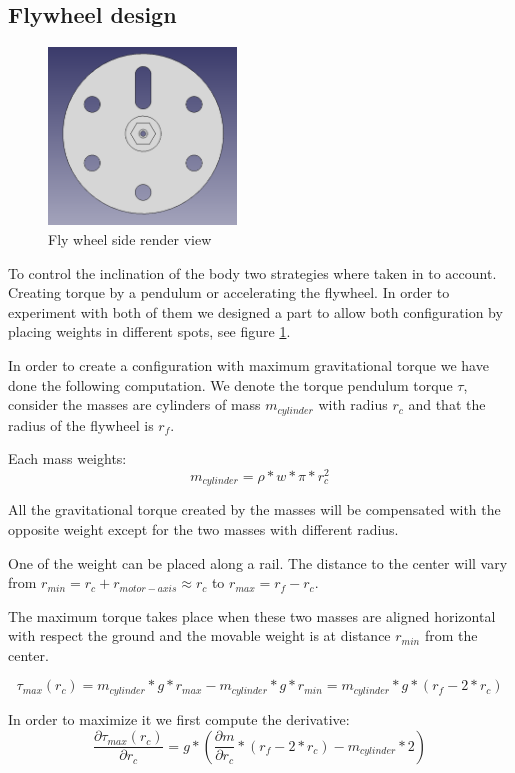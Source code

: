 \subsection{Flywheel design}
\begin{figure}
	\centering
	\includegraphics[width=5cm]{img/fly_wheel_side.png}
	\caption{Fly wheel side render view}
	\label{fig:Fly wheel side render view}
\end{figure}

To control the inclination of the body two strategies where taken in to account. Creating torque by a pendulum or accelerating the flywheel. In order to experiment with both of them we designed a part to allow both configuration by placing weights in different spots, see figure \ref{fig:Fly wheel side render view}.

In order to create a configuration with maximum gravitational torque we have done the following computation. We denote the torque pendulum torque $\tau$, consider the masses are cylinders of mass $m_{cylinder}$ with radius $r_c$ and that the radius of the flywheel is $r_f$.

Each mass weights:
\[ m_{cylinder} = \rho * w * \pi * r_c^2 \]

All the gravitational torque created by the masses will be compensated with the opposite weight except for the two masses with different radius.

One of the weight can be placed along a rail. The distance to the center will vary from $r_{min} = r_c + r_{motor-axis} \approx r_c $ to $r_{max} = r_f - r_c$. 

The maximum torque takes place when these two masses are aligned horizontal with respect the ground and the movable weight is at distance $r_{min}$ from the center.

\[ \tau _{max} (r_c) =  m_{cylinder} * g * r_{max} -  m_{cylinder} * g * r_{min} =  m_{cylinder}* g * (r_f - 2 * r_c) \]

In order to maximize it we first compute the derivative:
\[\frac{\partial \tau _{max} (r_c)}{\partial r_c} = g *(\frac{\partial m}{\partial r_c} * (r_f - 2 * r_c) -  m_{cylinder} * 2)\]

